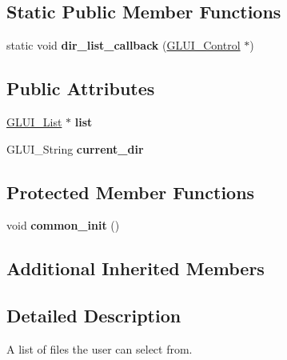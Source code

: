 \subsection*{Static Public Member Functions}
\begin{DoxyCompactItemize}
\item 
\hypertarget{class_g_l_u_i___file_browser_ae473d5085830f69178e4f4ff3db3f2b7}{static void {\bfseries dir\+\_\+list\+\_\+callback} (\hyperlink{class_g_l_u_i___control}{G\+L\+U\+I\+\_\+\+Control} $\ast$)}\label{class_g_l_u_i___file_browser_ae473d5085830f69178e4f4ff3db3f2b7}

\end{DoxyCompactItemize}
\subsection*{Public Attributes}
\begin{DoxyCompactItemize}
\item 
\hypertarget{class_g_l_u_i___file_browser_a58ad435f622fdbff82775ca2313506c1}{\hyperlink{class_g_l_u_i___list}{G\+L\+U\+I\+\_\+\+List} $\ast$ {\bfseries list}}\label{class_g_l_u_i___file_browser_a58ad435f622fdbff82775ca2313506c1}

\item 
\hypertarget{class_g_l_u_i___file_browser_a91d9710c76d5a3cb3bc7486a627a86f3}{G\+L\+U\+I\+\_\+\+String {\bfseries current\+\_\+dir}}\label{class_g_l_u_i___file_browser_a91d9710c76d5a3cb3bc7486a627a86f3}

\end{DoxyCompactItemize}
\subsection*{Protected Member Functions}
\begin{DoxyCompactItemize}
\item 
\hypertarget{class_g_l_u_i___file_browser_a0618241a9315adf0b2cd3514b93ac317}{void {\bfseries common\+\_\+init} ()}\label{class_g_l_u_i___file_browser_a0618241a9315adf0b2cd3514b93ac317}

\end{DoxyCompactItemize}
\subsection*{Additional Inherited Members}


\subsection{Detailed Description}
A list of files the user can select from. 

